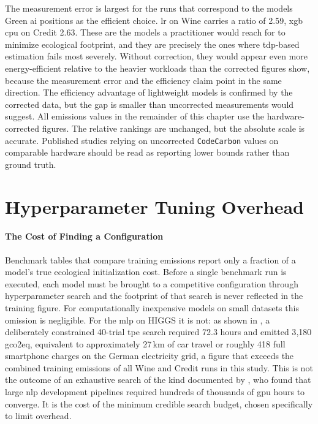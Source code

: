 The measurement error is largest for the runs that correspond to the models Green \gls{ai} positions as the efficient choice. \gls{lr} on Wine carries a ratio of 2.59, \gls{xgb} \gls{cpu} on Credit 2.63. These are the models a practitioner would reach for to minimize ecological footprint, and they are precisely the ones where \gls{tdp}-based estimation fails most severely. Without correction, they would appear even more energy-efficient relative to the heavier workloads than the corrected figures show, because the measurement error and the efficiency claim point in the same direction. The efficiency advantage of lightweight models is confirmed by the corrected data, but the gap is smaller than uncorrected measurements would suggest. All emissions values in the remainder of this chapter use the hardware-corrected figures. The relative rankings are unchanged, but the absolute scale is accurate. Published studies relying on uncorrected \texttt{CodeCarbon} values on comparable hardware should be read as reporting lower bounds rather than ground truth.


\section{Hyperparameter Tuning Overhead}
\label{sec:results_tuning}

\paragraph{The Cost of Finding a Configuration}
Benchmark tables that compare training emissions report only a fraction of a model's true ecological initialization cost. Before a single benchmark run is executed, each model must be brought to a competitive configuration through hyperparameter search and the footprint of that search is never reflected in the training figure. For computationally inexpensive models on small datasets this omission is negligible. For the \gls{mlp} on HIGGS it is not: as shown in , a deliberately constrained 40-trial \gls{tpe} search required 72.3 hours and emitted 3{,}180\,\gls{gco2eq}, equivalent to approximately 27\,km of car travel \parencite{europeanenvironmentagencyMonitoringCO2Emissions2025} or roughly 418 full smartphone charges on the German electricity grid, a figure that exceeds the combined training emissions of all Wine and Credit runs in this study. This is not the outcome of an exhaustive search of the kind documented by \citeauthor{strubellEnergyPolicyConsiderations2019a} \parencite{strubellEnergyPolicyConsiderations2019a}, who found that large \gls{nlp} development pipelines required hundreds of thousands of \gls{gpu} hours to converge. It is the cost of the minimum credible search budget, chosen specifically to limit overhead.

